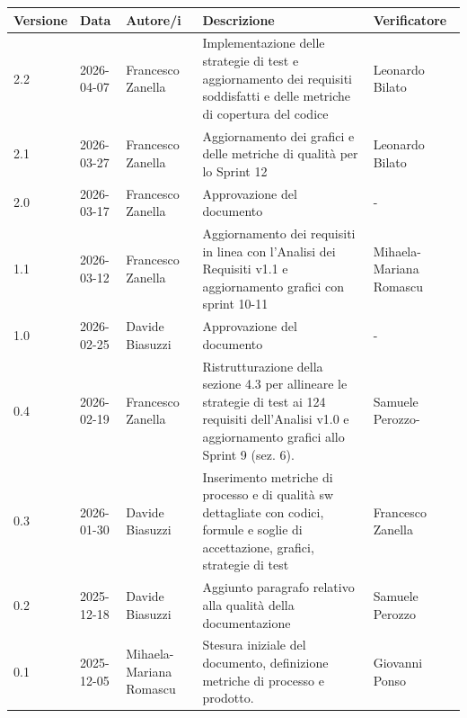\documentclass[a4paper,11pt,oneside]{scrartcl}
\begin{document}
\begin{center}
\renewcommand{\arraystretch}{1.5}
\begin{tabularx}{\textwidth}{@{}p{}p{}p{}X>{\centering\arraybackslash}p{}@{}}
\toprule
\textbf{Versione} & \textbf{Data} & \textbf{Autore/i} & \textbf{Descrizione} & \textbf{Verificatore} \\
\midrule
2.2 & 2026-04-07 & Francesco Zanella & Implementazione delle strategie di test e aggiornamento dei requisiti soddisfatti e delle metriche di copertura del codice & Leonardo Bilato\\
2.1 & 2026-03-27 & Francesco Zanella & Aggiornamento dei grafici e delle metriche di qualità per lo Sprint 12 & Leonardo Bilato\\
2.0 & 2026-03-17 & Francesco Zanella & Approvazione del documento & -\\
1.1 & 2026-03-12 & Francesco Zanella & Aggiornamento dei requisiti in linea con l'Analisi dei Requisiti v1.1 e aggiornamento grafici con sprint 10-11 & Mihaela-Mariana Romascu\\
1.0 & 2026-02-25 & Davide Biasuzzi & Approvazione del documento & -\\
0.4 & 2026-02-19 & Francesco Zanella & Ristrutturazione della sezione 4.3 per allineare le strategie di test ai 124 requisiti dell'Analisi v1.0 e aggiornamento grafici allo Sprint 9 (sez. 6). & Samuele Perozzo-\\
0.3 & 2026-01-30 & Davide Biasuzzi & Inserimento metriche di processo e di qualità sw dettagliate con codici, formule e soglie di accettazione, grafici, strategie di test & Francesco Zanella\\
0.2 & 2025-12-18 & Davide Biasuzzi & Aggiunto paragrafo relativo alla qualità della documentazione & Samuele Perozzo\\
0.1 & 2025-12-05 & Mihaela-Mariana Romascu & Stesura iniziale del documento, definizione metriche di processo e prodotto. & Giovanni Ponso\\
\bottomrule
\end{tabularx}
\end{center}

\newpage
\tableofcontents
\newpage

\end{document}
